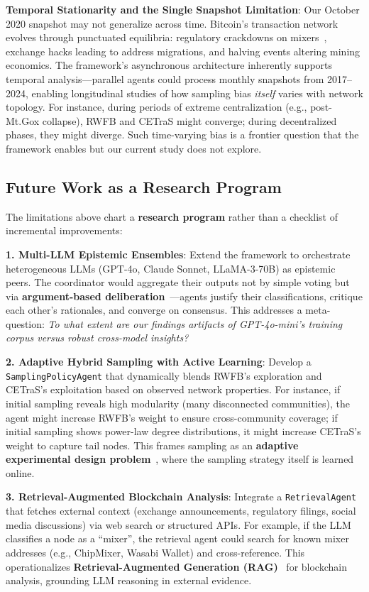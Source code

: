 \textbf{Temporal Stationarity and the Single Snapshot Limitation}: Our October 2020 snapshot may not generalize across time. Bitcoin's transaction network evolves through punctuated equilibria: regulatory crackdowns on mixers~\cite{europol2021}, exchange hacks leading to address migrations, and halving events altering mining economics. The framework's asynchronous architecture inherently supports temporal analysis---parallel agents could process monthly snapshots from 2017--2024, enabling longitudinal studies of how sampling bias \textit{itself} varies with network topology. For instance, during periods of extreme centralization (e.g., post-Mt.Gox collapse), RWFB and CETraS might converge; during decentralized phases, they might diverge. Such time-varying bias is a frontier question that the framework enables but our current study does not explore.

\subsection{Future Work as a Research Program}

The limitations above chart a \textbf{research program} rather than a checklist of incremental improvements:

\textbf{1. Multi-LLM Epistemic Ensembles}: Extend the framework to orchestrate heterogeneous LLMs (GPT-4o, Claude Sonnet, LLaMA-3-70B) as epistemic peers. The coordinator would aggregate their outputs not by simple voting but via \textbf{argument-based deliberation}~\cite{prakken2018}---agents justify their classifications, critique each other's rationales, and converge on consensus. This addresses a meta-question: \textit{To what extent are our findings artifacts of GPT-4o-mini's training corpus versus robust cross-model insights?}

\textbf{2. Adaptive Hybrid Sampling with Active Learning}: Develop a \texttt{SamplingPolicyAgent} that dynamically blends RWFB's exploration and CETraS's exploitation based on observed network properties. For instance, if initial sampling reveals high modularity (many disconnected communities), the agent might increase RWFB's weight to ensure cross-community coverage; if initial sampling shows power-law degree distributions, it might increase CETraS's weight to capture tail nodes. This frames sampling as an \textbf{adaptive experimental design problem}~\cite{murphy2005active}, where the sampling strategy itself is learned online.

\textbf{3. Retrieval-Augmented Blockchain Analysis}: Integrate a \texttt{RetrievalAgent} that fetches external context (exchange announcements, regulatory filings, social media discussions) via web search or structured APIs. For example, if the LLM classifies a node as a ``mixer'', the retrieval agent could search for known mixer addresses (e.g., ChipMixer, Wasabi Wallet) and cross-reference. This operationalizes \textbf{Retrieval-Augmented Generation (RAG)}~\cite{lewis2020rag} for blockchain analysis, grounding LLM reasoning in external evidence.


